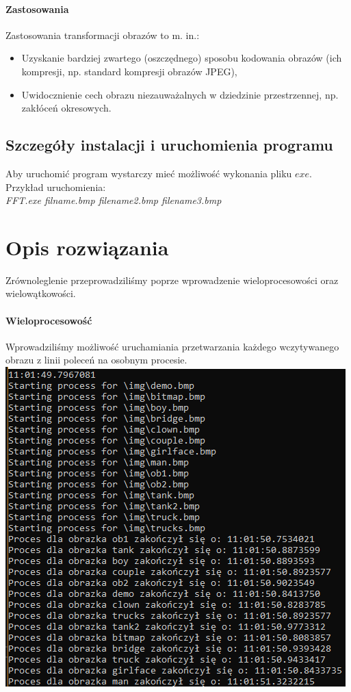 \paragraph{Zastosowania} Zastosowania transformacji obrazów to m. in.:
\begin{itemize}
	\item Uzyskanie bardziej zwartego (oszczędnego) sposobu kodowania obrazów
	(ich kompresji, np. standard kompresji obrazów JPEG),
	\item Uwidocznienie cech obrazu niezauważalnych w dziedzinie przestrzennej,
	np. zakłóceń okresowych.
\end{itemize}
\subsection{Szczegóły instalacji i uruchomienia programu} 
Aby uruchomić program wystarczy mieć możliwość wykonania pliku $exe$. \\
Przykład uruchomienia:\\

\textit{\Large{FFT.exe filname.bmp filename2.bmp filename3.bmp}}
\section{Opis rozwiązania}
Zrównoleglenie przeprowadziliśmy poprze wprowadzenie wieloprocesowości oraz wielowątkowości.
\paragraph{Wieloprocesowość} Wprowadziliśmy możliwość uruchamiania przetwarzania każdego wczytywanego obrazu z linii poleceń na osobnym procesie.\\
	\includegraphics[scale=1]{figures/Par13Wat4.png}
